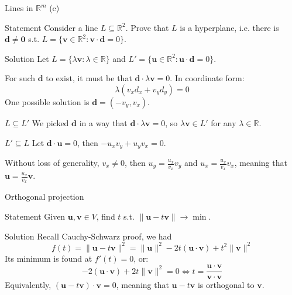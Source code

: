 \documentclass[10pt]{beamer}
\begin{document}
\begin{frame}{Lines in $\mathbb R^m$ (c)}
    \begin{center}
        
    \end{center}
    \begin{block}{Statement}
        Consider a line $L \subseteq \mathbb R^2$. Prove that $L$ is a hyperplane, i.e. there is $\mathbf d \neq \mathbf 0$ s.t. $L = \{\mathbf v \in \mathbb R^2: \mathbf v \cdot \mathbf d = 0\}$.
    \end{block}
\end{frame}

\begin{frame}{Solution}
    Let $L = \{\lambda \mathbf v : \lambda \in \mathbb R\}$ and $L' = \{\mathbf u \in \mathbb R^2 : \mathbf u \cdot \mathbf d = 0\}$.
    
    For such $\mathbf d$ to exist, it must be that $\mathbf d \cdot \lambda \mathbf v = 0$. In coordinate form:
    $$
    \lambda(v_x d_x + v_y d_y) = 0
    $$
    One possible solution is $\mathbf d =(-v_y, v_x)$.

    \begin{block}{$L \subseteq L'$}
        We picked $\mathbf d$ in a way that $\mathbf d \cdot \lambda \mathbf v =0$, so $\lambda \mathbf v \in L'$ for any $\lambda \in \mathbb R$.
    \end{block}
    \begin{block}{$L' \subseteq L$}
        Let $\mathbf d \cdot \mathbf u = 0$, then $-u_x v_y + u_y v_x = 0$.
        
        Without loss of generality, $v_x \neq 0$, then $u_y = \frac{u_x}{v_x} v_y$ and $u_x = \frac{u_x}{v_x} v_x$, meaning that $\mathbf u = \frac{u_x}{v_x} \mathbf v$.
    \end{block}
\end{frame}

\begin{frame}{Orthogonal projection}
    \begin{center}
        
    \end{center}
    \begin{block}{Statement}
        Given $\mathbf u, \mathbf v \in V$, find $t$ s.t. $\|\mathbf u - t \mathbf v\| \to \min$.
    \end{block}
\end{frame}

\begin{frame}{Solution}
    Recall Cauchy-Schwarz proof, we had
    $$
    f(t) = \|\mathbf u - t\mathbf v\|^2 = \|\mathbf u\|^2 -2t(\mathbf u \cdot \mathbf v) + t^2 \|\mathbf v\|^2
    $$
    Its minimum is found at $f'(t)=0$, or:
    $$
    -2 (\mathbf u \cdot \mathbf v) + 2t \|\mathbf v\|^2 = 0 \iff \boxed{t = \frac{\mathbf u \cdot \mathbf v}{\mathbf v \cdot \mathbf v}}
    $$
    Equivalently, $(\mathbf u - t \mathbf v) \cdot \mathbf v = 0$, meaning that $\mathbf u - t \mathbf v$ is orthogonal to $\mathbf v$.
\end{frame}
\end{document}
